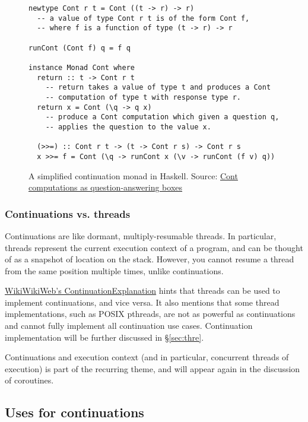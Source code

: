 \documentclass[]{article}
\begin{document}
\begin{figure}[]
  \centering
\begin{verbatim}
newtype Cont r t = Cont ((t -> r) -> r)
  -- a value of type Cont r t is of the form Cont f,
  -- where f is a function of type (t -> r) -> r

runCont (Cont f) q = f q

instance Monad Cont where
  return :: t -> Cont r t
    -- return takes a value of type t and produces a Cont
    -- computation of type t with response type r.
  return x = Cont (\q -> q x)
    -- produce a Cont computation which given a question q,
    -- applies the question to the value x.

  (>>=) :: Cont r t -> (t -> Cont r s) -> Cont r s
  x >>= f = Cont (\q -> runCont x (\v -> runCont (f v) q))
\end{verbatim}
  \caption{A simplified continuation monad in Haskell. Source: \href{https://wiki.haskell.org/Cont_computations_as_question-answering_boxes}{Cont computations as question-answering boxes}}
  \label{fig:mona}
\end{figure}

\subsubsection{Continuations vs. threads}
\label{sec:vsth}

Continuations are like dormant, multiply-resumable threads. In particular, threads represent the current execution context of a program, and can be thought of as a snapshot of location on the stack. However, you cannot resume a thread from the same position  multiple times, unlike continuations.

\href{https://wiki.c2.com/?ContinuationExplanation}{WikiWikiWeb's ContinuationExplanation} hints that threads can be used to implement continuations, and vice versa. It also mentions that some thread implementations, such as POSIX pthreads, are not as powerful as continuations and cannot fully implement all continuation use cases. Continuation implementation will be further discussed in \S{\ref{sec:thre}}.

Continuations and execution context (and in particular, concurrent threads of execution) is part of the recurring theme, and will appear again in the discussion of coroutines.

\subsection{Uses for continuations}
\label{sec:uses}
\end{document}
